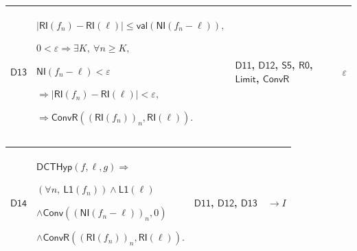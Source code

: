 \documentclass[11pt]{amsart}
\newlength{\FTCFourColumnBody}
\begin{document}
{\begin{tabular}
\end{tabular}%
\par\setlength{\parskip}{0pt}\nointerlineskip
\noindent
\begin{tabular}{|@{}>{\centering\arraybackslash}m{0.078431\FTCFourColumnBody}|>{\centering\arraybackslash}m{0.535947\FTCFourColumnBody}|>{\centering\arraybackslash}m{0.281045\FTCFourColumnBody}|>{\centering\arraybackslash}m{0.104575\FTCFourColumnBody}|}\hline
\hypertarget{dct:D13}{$\displaystyle \textsf{D13}$} & $\displaystyle |\textsf{RI}(f_n)-\textsf{RI}(\ell)|\le\textsf{val}(\textsf{NI}(f_n-\ell)),$\par
$\displaystyle 0<\varepsilon\Rightarrow\exists K,\ \forall n\ge K,$\par
$\displaystyle \textsf{NI}(f_n-\ell)<\varepsilon$\par
$\displaystyle \Rightarrow|\textsf{RI}(f_n)-\textsf{RI}(\ell)|<\varepsilon,$\par
$\displaystyle \Rightarrow\textsf{ConvR}((\textsf{RI}(f_n))_n,\textsf{RI}(\ell)).$ & \hyperlink{dct:D11}{$\displaystyle \textsf{D11}$}, \hyperlink{dct:D12}{$\displaystyle \textsf{D12}$}, \hyperlink{dct:S5}{$\displaystyle \textsf{S5}$}, \hyperlink{dct:R0}{$\displaystyle \textsf{R0}$}, \hyperlink{def:Limit}{$\displaystyle \textsf{Limit}$}, \hyperlink{dctdef:ConvR}{$\displaystyle \textsf{ConvR}$} & $\displaystyle \varepsilon$\\ \hline
\end{tabular}%
\par\setlength{\parskip}{0pt}\nointerlineskip
\noindent
\begin{tabular}{|@{}>{\centering\arraybackslash}m{0.078431\FTCFourColumnBody}|>{\centering\arraybackslash}m{0.535947\FTCFourColumnBody}|>{\centering\arraybackslash}m{0.281045\FTCFourColumnBody}|>{\centering\arraybackslash}m{0.104575\FTCFourColumnBody}|}\hline
\hypertarget{dct:D14}{$\displaystyle \textsf{D14}$} & $\displaystyle \textsf{DCTHyp}(f,\ell,g)\Rightarrow$\par
$\displaystyle (\forall n,\ \textsf{L1}(f_n))\land\textsf{L1}(\ell)$\par
$\displaystyle \land\textsf{Conv}((\textsf{NI}(f_n-\ell))_n,0)$\par
$\displaystyle \land\textsf{ConvR}((\textsf{RI}(f_n))_n,\textsf{RI}(\ell)).$ & \hyperlink{dct:D11}{$\displaystyle \textsf{D11}$}, \hyperlink{dct:D12}{$\displaystyle \textsf{D12}$}, \hyperlink{dct:D13}{$\displaystyle \textsf{D13}$} & $\displaystyle \to I$\\ \hline
\end{tabular}%
\par
}
\end{document}
